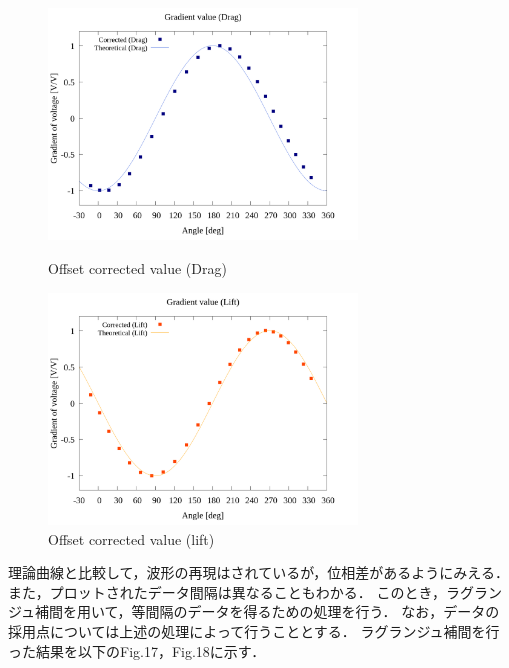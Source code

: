 \documentclass[twocolumn,a4j]{jsarticle}
\begin{document}
\begin{figure}[htbp]
    \begin{center}
    \includegraphics[width=82mm]{../../../02_workspace/result/simulation_tx=10.0_ty=-5.0_dx=5.00_dy=-2.50/plot/21/21-2_corrected_offset_drag.png}
    \caption{Offset corrected value (Drag)}
    \includegraphics[width=82mm]{../../../02_workspace/result/simulation_tx=10.0_ty=-5.0_dx=5.00_dy=-2.50/plot/21/21-2_corrected_offset_lift.png}
    \caption{Offset corrected value (lift)}
    \end{center}
\end{figure}

\newpage

理論曲線と比較して，波形の再現はされているが，位相差があるようにみえる．
また，プロットされたデータ間隔は異なることもわかる．
このとき，ラグランジュ補間を用いて，等間隔のデータを得るための処理を行う．
なお，データの採用点については上述の処理によって行うこととする．
ラグランジュ補間を行った結果を以下のFig.17，Fig.18に示す．
\end{document}
